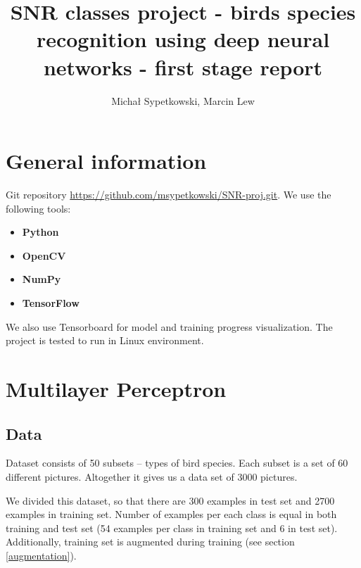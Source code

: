 \documentclass[a4paper]{article}
\begin{document}
\title{SNR classes project - birds species recognition using deep neural networks
- first stage report}

\author{Michał Sypetkowski, Marcin Lew}
\maketitle







\begin{multicols}{2}

\section{General information}
Git repository \url{https://github.com/msypetkowski/SNR-proj.git}.
We use the following tools:
\begin{itemize}
    \item \textbf{Python}\cite{Python}
    \item \textbf{OpenCV}\cite{OpenCV}
    \item \textbf{NumPy}\cite{NumPy}
    \item \textbf{TensorFlow}\cite{TensorFlow}
\end{itemize}
We also use Tensorboard for model and training progress visualization.
The project is tested to run in Linux environment.

\section{Multilayer Perceptron}

\subsection{Data}
Dataset consists of 50 subsets -- types of bird species.
Each subset is a set of 60 different pictures.
Altogether it gives us a data set of 3000 pictures.

We divided this dataset, so that there are 300 examples in test set and
2700 examples in training set.
Number of examples per each class is equal in both training and test set
(54 examples per class in training set and 6 in test set).
Additionally, training set is augmented during training (see section \ref{augmentation}).



\end{multicols}
\end{document}

